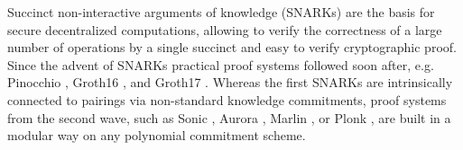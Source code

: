 \documentclass[10pt,article,oneside]{memoir}
\theoremstyle{definition}
\theoremstyle{remark}
\begin{document}
Succinct non-interactive arguments of knowledge (SNARKs) are the basis for secure decentralized computations, allowing to verify the correctness of a large number of operations by a single succinct and easy to verify cryptographic proof. 
Since the advent of SNARKs \cite{Groth:2010, Gennaro:2013} practical proof systems followed soon after, e.g. Pinocchio \cite{Pinocchio}, Groth16 \cite{Groth:2016}, and Groth17 \cite{Groth:2017}.  
Whereas the first SNARKs are intrinsically connected to pairings via non-standard knowledge commitments, 
proof systems from the second wave, such as Sonic \cite{Sonic}, Aurora \cite{Aurora}, Marlin \cite{Marlin}, or Plonk \cite{Plonk}, are built in a modular way on any polynomial commitment scheme.

 
\end{document}
